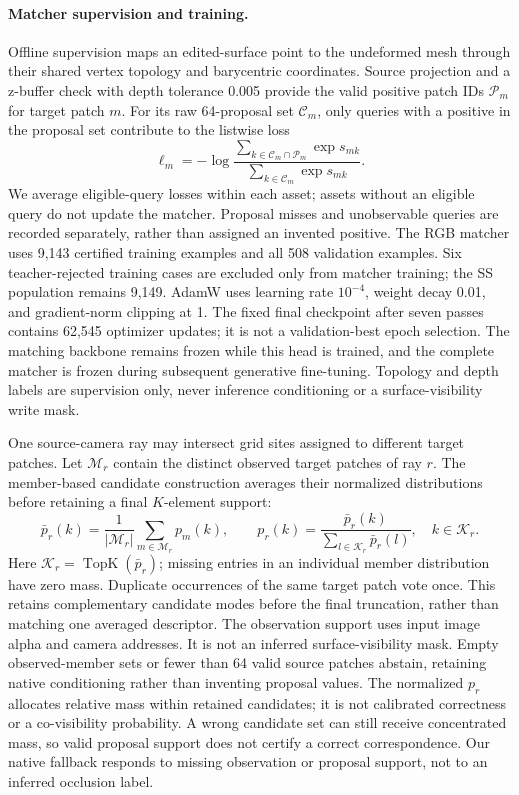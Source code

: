 \documentclass[10pt]{article}
\begin{document}
\paragraph{Matcher supervision and training.}
Offline supervision maps an edited-surface point to the undeformed mesh
through their shared vertex topology and barycentric coordinates. Source
projection and a z-buffer check with depth tolerance 0.005 provide the valid
positive patch IDs $\mathcal P_m$ for target patch $m$. For its raw 64-proposal
set $\mathcal C_m$, only queries with a positive in the proposal set contribute
to the listwise loss
\begin{equation}
 \ell_m=-\log\frac{\sum_{k\in\mathcal C_m\cap\mathcal P_m}\exp s_{mk}}
                         {\sum_{k\in\mathcal C_m}\exp s_{mk}}.
\end{equation}
We average eligible-query losses within each asset; assets without an
eligible query do not update the matcher. Proposal misses and unobservable
queries are recorded separately, rather than assigned an invented positive.
The RGB matcher uses 9,143 certified training examples and all 508 validation
examples. Six teacher-rejected training cases are excluded only from matcher
training; the SS population remains 9,149. AdamW uses learning rate $10^{-4}$,
weight decay 0.01, and gradient-norm clipping at 1. The fixed final checkpoint
after seven passes contains 62,545 optimizer updates; it is not a
validation-best epoch selection. The matching backbone remains frozen while
this head is trained, and the complete matcher is frozen during subsequent
generative fine-tuning. Topology and depth labels are supervision only, never
inference conditioning or a surface-visibility write mask.

One source-camera ray may intersect grid sites assigned to different target
patches. Let $\mathcal M_r$ contain the distinct observed target patches of ray
$r$. The member-based candidate construction averages their normalized
distributions before retaining a final $K$-element support:
\begin{equation}
 \bar p_r(k)=\frac{1}{|\mathcal M_r|}\sum_{m\in\mathcal M_r}p_m(k),\qquad
 p_r(k)=\frac{\bar p_r(k)}{\sum_{l\in\mathcal K_r}\bar p_r(l)},\quad k\in\mathcal K_r.
\end{equation}
Here $\mathcal K_r=\operatorname{TopK}(\bar p_r)$; missing entries in an
individual member distribution have zero mass. Duplicate occurrences of the
same target patch vote once. This retains complementary candidate modes
before the final truncation, rather than matching one averaged descriptor.
The observation support uses input image alpha and camera addresses. It is
not an inferred surface-visibility mask.
Empty observed-member sets or fewer than 64 valid source patches abstain,
retaining native conditioning rather than inventing proposal values.
The normalized $p_r$ allocates relative mass within retained candidates;
it is not calibrated correctness or a co-visibility probability. A wrong
candidate set can still receive concentrated mass, so valid proposal support
does not certify a correct correspondence. Our native fallback responds to
missing observation or proposal support, not to an inferred occlusion label.
\end{document}
